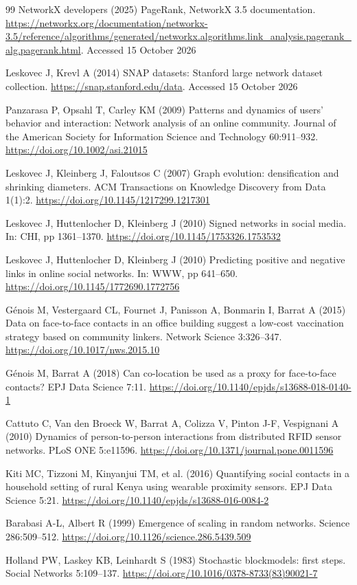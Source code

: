 \begin{thebibliography}{99}
 NetworkX developers (2025) PageRank, NetworkX 3.5 documentation. \url{https://networkx.org/documentation/networkx-3.5/reference/algorithms/generated/networkx.algorithms.link_analysis.pagerank_alg.pagerank.html}. Accessed 15 October 2026

 Leskovec J, Krevl A (2014) SNAP datasets: Stanford large network dataset collection. \url{https://snap.stanford.edu/data}. Accessed 15 October 2026

 Panzarasa P, Opsahl T, Carley KM (2009) Patterns and dynamics of users' behavior and interaction: Network analysis of an online community. Journal of the American Society for Information Science and Technology 60:911--932. \url{https://doi.org/10.1002/asi.21015}

 Leskovec J, Kleinberg J, Faloutsos C (2007) Graph evolution: densification and shrinking diameters. ACM Transactions on Knowledge Discovery from Data 1(1):2. \url{https://doi.org/10.1145/1217299.1217301}

 Leskovec J, Huttenlocher D, Kleinberg J (2010) Signed networks in social media. In: CHI, pp 1361--1370. \url{https://doi.org/10.1145/1753326.1753532}

 Leskovec J, Huttenlocher D, Kleinberg J (2010) Predicting positive and negative links in online social networks. In: WWW, pp 641--650. \url{https://doi.org/10.1145/1772690.1772756}

 Génois M, Vestergaard CL, Fournet J, Panisson A, Bonmarin I, Barrat A (2015) Data on face-to-face contacts in an office building suggest a low-cost vaccination strategy based on community linkers. Network Science 3:326--347. \url{https://doi.org/10.1017/nws.2015.10}

 Génois M, Barrat A (2018) Can co-location be used as a proxy for face-to-face contacts? EPJ Data Science 7:11. \url{https://doi.org/10.1140/epjds/s13688-018-0140-1}

 Cattuto C, Van den Broeck W, Barrat A, Colizza V, Pinton J-F, Vespignani A (2010) Dynamics of person-to-person interactions from distributed RFID sensor networks. PLoS ONE 5:e11596. \url{https://doi.org/10.1371/journal.pone.0011596}

 Kiti MC, Tizzoni M, Kinyanjui TM, et al. (2016) Quantifying social contacts in a household setting of rural Kenya using wearable proximity sensors. EPJ Data Science 5:21. \url{https://doi.org/10.1140/epjds/s13688-016-0084-2}

 Barabasi A-L, Albert R (1999) Emergence of scaling in random networks. Science 286:509--512. \url{https://doi.org/10.1126/science.286.5439.509}

 Holland PW, Laskey KB, Leinhardt S (1983) Stochastic blockmodels: first steps. Social Networks 5:109--137. \url{https://doi.org/10.1016/0378-8733(83)90021-7}
\end{thebibliography}
